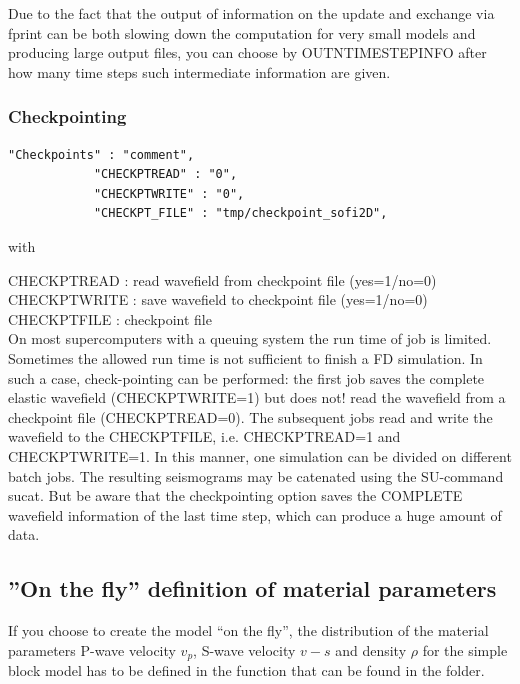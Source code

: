 \documentclass[11pt,onecolumn,oneside]{article}
\begin{document}
Due to the fact that the output of information on the update and exchange via fprint can be both slowing down the computation for very small models and producing large output files, you can choose by OUTNTIMESTEPINFO after how many time steps such intermediate information are given.

\subsubsection{Checkpointing}
\begin{verbatim}
"Checkpoints" : "comment",
			"CHECKPTREAD" : "0",
			"CHECKPTWRITE" : "0",
			"CHECKPT_FILE" : "tmp/checkpoint_sofi2D",
\end{verbatim}

with

CHECKPTREAD : read wavefield from checkpoint file (yes=1/no=0)\\
CHECKPTWRITE : save wavefield to checkpoint file (yes=1/no=0)\\
CHECKPTFILE : checkpoint file\\


On most supercomputers with a queuing system the run time of job is limited. Sometimes the allowed run time is not sufficient to finish a FD simulation. In such a case, check-pointing can be performed: the first job saves the complete elastic wavefield (CHECKPTWRITE=1) but does not! read the wavefield from a checkpoint file (CHECKPTREAD=0). The subsequent jobs read and write the wavefield to the CHECKPTFILE, i.e. CHECKPTREAD=1 and CHECKPTWRITE=1. In this manner, one simulation can be divided on different batch jobs. The resulting seismograms may be catenated using the SU-command sucat. But be aware that the checkpointing option saves the COMPLETE wavefield information of the last time step, which can produce a huge amount of data.

\subsection{''On the fly'' definition of material parameters}
\label{model_def_func}
If you choose to create the model ``on the fly'', the distribution of the material parameters P-wave velocity $v_p$, S-wave velocity $v-s$ and density $\rho$ for the simple block model has to be defined in the function  that can be found in the  folder.
\end{document}
